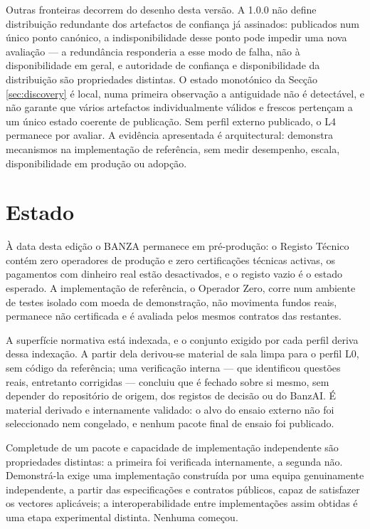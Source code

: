 \documentclass[journal abbreviation, manuscript]{copernicus}
\begin{document}
Outras fronteiras decorrem do desenho desta versão. A 1.0.0 não define distribuição redundante dos artefactos de confiança já assinados: publicados num único ponto canónico, a indisponibilidade desse ponto pode impedir uma nova avaliação --- a redundância responderia a esse modo de falha, não à disponibilidade em geral, e autoridade de confiança e disponibilidade da distribuição são propriedades distintas. O estado monotónico da Secção \ref{sec:discovery} é local, numa primeira observação a antiguidade não é detectável, e não garante que vários artefactos individualmente válidos e frescos pertençam a um único estado coerente de publicação. Sem perfil externo publicado, o L4 permanece por avaliar. A evidência apresentada é arquitectural: demonstra mecanismos na implementação de referência, sem medir desempenho, escala, disponibilidade em produção ou adopção.


\section{Estado}\label{sec:state}

À data desta edição o BANZA permanece em pré-produção: o Registo Técnico contém zero operadores de produção e zero certificações técnicas activas, os pagamentos com dinheiro real estão desactivados, e o registo vazio é o estado esperado. A implementação de referência, o Operador Zero, corre num ambiente de testes isolado com moeda de demonstração, não movimenta fundos reais, permanece não certificada e é avaliada pelos mesmos contratos das restantes.

A superfície normativa está indexada, e o conjunto exigido por cada perfil deriva dessa indexação. A partir dela derivou-se material de sala limpa para o perfil L0, sem código da referência; uma verificação interna --- que identificou questões reais, entretanto corrigidas --- concluiu que é fechado sobre si mesmo, sem depender do repositório de origem, dos registos de decisão ou do BanzAI. É material derivado e internamente validado: o alvo do ensaio externo não foi seleccionado nem congelado, e nenhum pacote final de ensaio foi publicado.

Completude de um pacote e capacidade de implementação independente são propriedades distintas: a primeira foi verificada internamente, a segunda não. Demonstrá-la exige uma implementação construída por uma equipa genuinamente independente, a partir das especificações e contratos públicos, capaz de satisfazer os vectores aplicáveis; a interoperabilidade entre implementações assim obtidas é uma etapa experimental distinta. Nenhuma começou.
\end{document}
